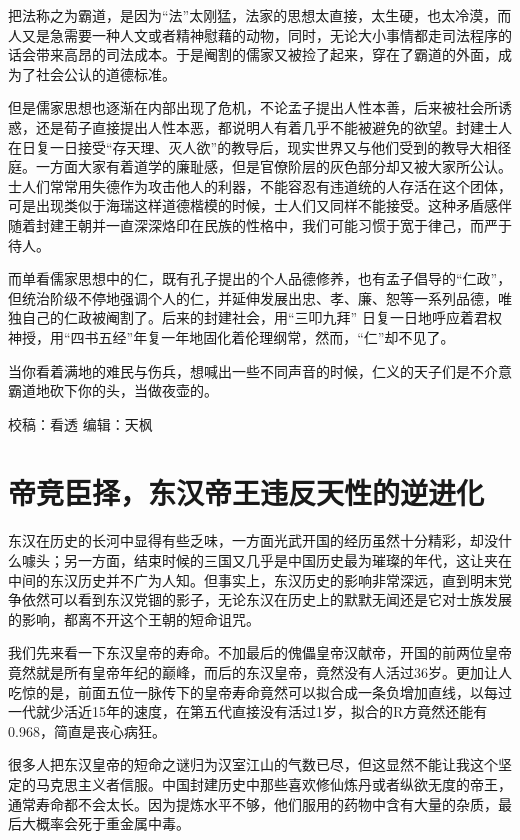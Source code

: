 \documentclass[]{book}
\begin{document}
把法称之为霸道，是因为``法''太刚猛，法家的思想太直接，太生硬，也太冷漠，而人又是急需要一种人文或者精神慰藉的动物，同时，无论大小事情都走司法程序的话会带来高昂的司法成本。于是阉割的儒家又被捡了起来，穿在了霸道的外面，成为了社会公认的道德标准。

但是儒家思想也逐渐在内部出现了危机，不论孟子提出人性本善，后来被社会所诱惑，还是荀子直接提出人性本恶，都说明人有着几乎不能被避免的欲望。封建士人在日复一日接受``存天理、灭人欲''的教导后，现实世界又与他们受到的教导大相径庭。一方面大家有着道学的廉耻感，但是官僚阶层的灰色部分却又被大家所公认。士人们常常用失德作为攻击他人的利器，不能容忍有违道统的人存活在这个团体，可是出现类似于海瑞这样道德楷模的时候，士人们又同样不能接受。这种矛盾感伴随着封建王朝并一直深深烙印在民族的性格中，我们可能习惯于宽于律己，而严于待人。

而单看儒家思想中的仁，既有孔子提出的个人品德修养，也有孟子倡导的``仁政''，但统治阶级不停地强调个人的仁，并延伸发展出忠、孝、廉、恕等一系列品德，唯独自己的仁政被阉割了。后来的封建社会，用``三叩九拜'' 日复一日地呼应着君权神授，用``四书五经''年复一年地固化着伦理纲常，然而，``仁''却不见了。

当你看着满地的难民与伤兵，想喊出一些不同声音的时候，仁义的天子们是不介意霸道地砍下你的头，当做夜壶的。

校稿：看透
编辑：天枫

\hypertarget{ux5e1dux7adeux81e3ux62e9ux4e1cux6c49ux5e1dux738bux8fddux53cdux5929ux6027ux7684ux9006ux8fdbux5316}{%
\section{帝竞臣择，东汉帝王违反天性的逆进化}\label{ux5e1dux7adeux81e3ux62e9ux4e1cux6c49ux5e1dux738bux8fddux53cdux5929ux6027ux7684ux9006ux8fdbux5316}}

东汉在历史的长河中显得有些乏味，一方面光武开国的经历虽然十分精彩，却没什么噱头；另一方面，结束时候的三国又几乎是中国历史最为璀璨的年代，这让夹在中间的东汉历史并不广为人知。但事实上，东汉历史的影响非常深远，直到明末党争依然可以看到东汉党锢的影子，无论东汉在历史上的默默无闻还是它对士族发展的影响，都离不开这个王朝的短命诅咒。

我们先来看一下东汉皇帝的寿命。不加最后的傀儡皇帝汉献帝，开国的前两位皇帝竟然就是所有皇帝年纪的巅峰，而后的东汉皇帝，竟然没有人活过36岁。更加让人吃惊的是，前面五位一脉传下的皇帝寿命竟然可以拟合成一条负增加直线，以每过一代就少活近15年的速度，在第五代直接没有活过1岁，拟合的R方竟然还能有0.968，简直是丧心病狂。

很多人把东汉皇帝的短命之谜归为汉室江山的气数已尽，但这显然不能让我这个坚定的马克思主义者信服。中国封建历史中那些喜欢修仙炼丹或者纵欲无度的帝王，通常寿命都不会太长。因为提炼水平不够，他们服用的药物中含有大量的杂质，最后大概率会死于重金属中毒。
\end{document}
